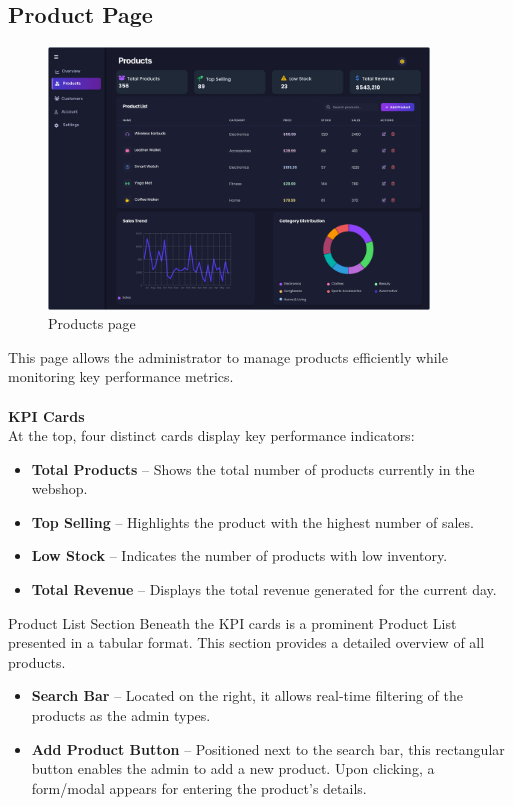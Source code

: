 \documentclass[11pt,a4paper]{article}
\begin{document}
\subsection{Product Page}\label{subsec:product-page}
	\begin{figure}[h]
    \centering
    \includegraphics[width=0.9\textwidth]{pictures/admin/Products_Admin}
     \caption{Products page}\label{fig:figure2}
\end{figure}
This page allows the administrator to manage products efficiently while monitoring key performance metrics. \\ \\
\textbf{KPI Cards} \\
At the top, four distinct cards display key performance indicators:
\begin{itemize}
\item \textbf{Total Products} – Shows the total number of products currently in the webshop.
\item \textbf{Top Selling} – Highlights the product with the highest number of sales.
\item \textbf{Low Stock} – Indicates the number of products with low inventory.
\item \textbf{Total Revenue} – Displays the total revenue generated for the current day.
\end{itemize}
Product List Section
Beneath the KPI cards is a prominent Product List presented in a tabular format. This section provides a detailed overview of all products.
\begin{itemize}
\item \textbf{Search Bar} – Located on the right, it allows real-time filtering of the products as the admin types.
\item \textbf{Add Product Button} – Positioned next to the search bar, this rectangular button enables the admin to add a new product. Upon clicking, a form/modal appears for entering the product’s details.
\end{itemize}
\end{document}
